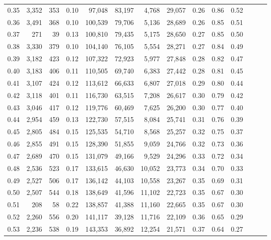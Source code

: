 \begin{tabular}{rrrrrrrrrrrrrr}
0.35 &  3,352 &  353 &  0.10 &   97,048 &   83,197 &   4,768 &  29,057 &  0.26 &  0.86 &      0.52 \\
0.36 &  3,491 &  368 &  0.10 &  100,539 &   79,706 &   5,136 &  28,689 &  0.26 &  0.85 &      0.51 \\
0.37 &    271 &   39 &  0.13 &  100,810 &   79,435 &   5,175 &  28,650 &  0.27 &  0.85 &      0.50 \\
0.38 &  3,330 &  379 &  0.10 &  104,140 &   76,105 &   5,554 &  28,271 &  0.27 &  0.84 &      0.49 \\
0.39 &  3,182 &  423 &  0.12 &  107,322 &   72,923 &   5,977 &  27,848 &  0.28 &  0.82 &      0.47 \\
0.40 &  3,183 &  406 &  0.11 &  110,505 &   69,740 &   6,383 &  27,442 &  0.28 &  0.81 &      0.45 \\
0.41 &  3,107 &  424 &  0.12 &  113,612 &   66,633 &   6,807 &  27,018 &  0.29 &  0.80 &      0.44 \\
0.42 &  3,118 &  401 &  0.11 &  116,730 &   63,515 &   7,208 &  26,617 &  0.30 &  0.79 &      0.42 \\
0.43 &  3,046 &  417 &  0.12 &  119,776 &   60,469 &   7,625 &  26,200 &  0.30 &  0.77 &      0.40 \\
0.44 &  2,954 &  459 &  0.13 &  122,730 &   57,515 &   8,084 &  25,741 &  0.31 &  0.76 &      0.39 \\
0.45 &  2,805 &  484 &  0.15 &  125,535 &   54,710 &   8,568 &  25,257 &  0.32 &  0.75 &      0.37 \\
0.46 &  2,855 &  491 &  0.15 &  128,390 &   51,855 &   9,059 &  24,766 &  0.32 &  0.73 &      0.36 \\
0.47 &  2,689 &  470 &  0.15 &  131,079 &   49,166 &   9,529 &  24,296 &  0.33 &  0.72 &      0.34 \\
0.48 &  2,536 &  523 &  0.17 &  133,615 &   46,630 &  10,052 &  23,773 &  0.34 &  0.70 &      0.33 \\
0.49 &  2,527 &  506 &  0.17 &  136,142 &   44,103 &  10,558 &  23,267 &  0.35 &  0.69 &      0.31 \\
0.50 &  2,507 &  544 &  0.18 &  138,649 &   41,596 &  11,102 &  22,723 &  0.35 &  0.67 &      0.30 \\
0.51 &    208 &   58 &  0.22 &  138,857 &   41,388 &  11,160 &  22,665 &  0.35 &  0.67 &      0.30 \\
0.52 &  2,260 &  556 &  0.20 &  141,117 &   39,128 &  11,716 &  22,109 &  0.36 &  0.65 &      0.29 \\
0.53 &  2,236 &  538 &  0.19 &  143,353 &   36,892 &  12,254 &  21,571 &  0.37 &  0.64 &      0.27 \\

\end{tabular}
